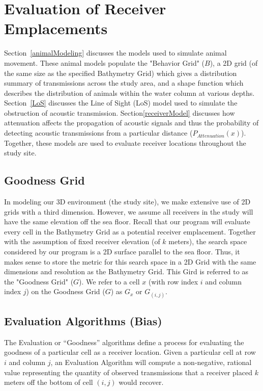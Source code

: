 \section{Evaluation of Receiver Emplacements}
\label{evaluationOfReceierEmplacements}
Section~\ref{animalModeling} discusses the models used to simulate animal movement.  These animal models populate the "Behavior Grid" ($B$), a 2D grid (of the same size as the specified Bathymetry Grid) which gives a distribution summary of transmissions across the study area, and a shape function which describes the distribution of animals within the water column at various depths.  Section~\ref{LoS} discusses the Line of Sight (LoS) model used to simulate the obstruction of acoustic transmission.  Section\ref{receiverModel} discusses how attenuation affects the propagation of acoustic signals and thus the probability of detecting acoustic transmissions from a particular distance ($P_{Attenuation}(x)$).  Together, these models are used to evaluate receiver locations throughout the study site.  

\subsection{Goodness Grid}
\label{GoodnessGrid}
In modeling our 3D environment (the study site), we make extensive use of 2D grids with a third dimension.  However, we assume all receivers in the study will have the same elevation off the sea floor.  Recall that our program will evaluate every cell in the Bathymetry Grid as a potential receiver emplacement.  Together with the assumption of fixed receiver elevation (of $k$ meters), the search space considered by our program is a 2D surface parallel to the sea floor.  Thus, it makes sense to store the metric for this search space in a 2D Grid with the same dimensions and resolution as the Bathymetry Grid.  This Gird is referred to as the "Goodness Grid" ($G$).  We refer to a cell $x$ (with row index $i$ and column index $j$) on the Goodness Grid ($G$) as $G_x$ or $G_{(i,j)}$. 


\subsection{Evaluation Algorithms (Bias)}
\label{evalAlgorithms}
The Evaluation or “Goodness” algorithms define a process for evaluating the goodness of a particular cell as a receiver location.  Given a particular cell at row $i$ and column $j$, an Evaluation Algorithm will compute a non-negative, rational value representing the quantity of observed transmissions that a receiver placed $k$ meters off the bottom of cell $(i,j)$ would recover.

